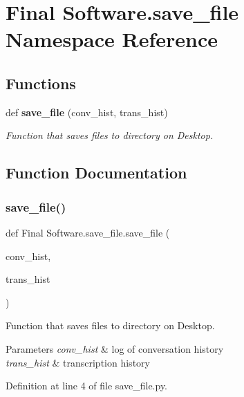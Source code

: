 \section{Final Software.\+save\+\_\+file Namespace Reference}
\label{namespace_final_01_software_1_1save__file}
\subsection*{Functions}
\begin{DoxyCompactItemize}
\item 
def \textbf{ save\+\_\+file} (conv\+\_\+hist, trans\+\_\+hist)
\begin{DoxyCompactList}\small\item\em Function that saves files to directory on Desktop. \end{DoxyCompactList}\end{DoxyCompactItemize}


\subsection{Function Documentation}
\mbox{\label{namespace_final_01_software_1_1save__file_ad2d2ca76a88063f3b2fe7eb85e247099}} 
\subsubsection{save\_file()}
{\footnotesize\ttfamily def Final Software.\+save\+\_\+file.\+save\+\_\+file (\begin{DoxyParamCaption}\item[{}]{conv\+\_\+hist,  }\item[{}]{trans\+\_\+hist }\end{DoxyParamCaption})}



Function that saves files to directory on Desktop. 


\begin{DoxyParams}{Parameters}
{\em conv\+\_\+hist} & log of conversation history \\
\hline
{\em trans\+\_\+hist} & transcription history \\
\hline
\end{DoxyParams}


Definition at line 4 of file save\+\_\+file.\+py.

